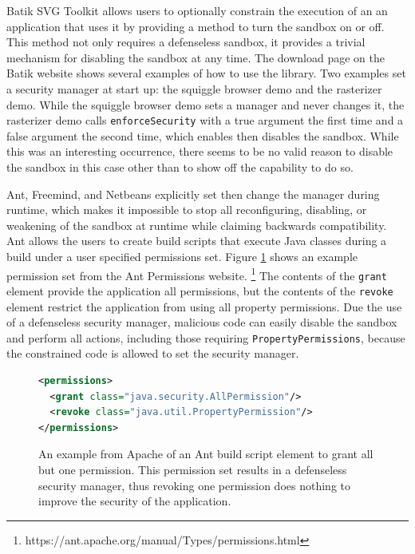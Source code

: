 \documentclass{sig-alternate}
\begin{document}
Batik SVG Toolkit allows users to optionally constrain the execution of an an application
that uses it by providing a method to turn the sandbox on or off. This method not only requires a defenseless sandbox, it provides a trivial mechanism for disabling the sandbox at any time. The download page on the Batik
website shows several examples of how to use the library. Two examples set
a security manager at start up: the squiggle browser demo and the
rasterizer demo. While the squiggle browser demo sets a manager and
never changes it, the rasterizer demo calls \texttt{enforceSecurity}
with a true argument the first time and a false argument the second
time, which enables then disables the sandbox. While this was an interesting
occurrence, there seems to be no valid reason to disable the sandbox
in this case other than to show off the capability to do so.

Ant, Freemind, and Netbeans explicitly set then change the manager
during runtime, which makes it impossible to stop all reconfiguring, disabling, or weakening of the sandbox at runtime while claiming backwards compatibility. Ant allows the users to create build scripts that
execute Java classes during a build under a user specified
permissions set. Figure \ref{fig:Ant Permissions Example}
shows an example permission set from the Ant Permissions website.%
\footnote{https://ant.apache.org/manual/Types/permissions.html%
} The contents of the \texttt{grant} element provide the application
all permissions, but the contents of the \texttt{revoke} element restrict
the application from using all property permissions. Due the use of a
defenseless security manager, malicious code can easily disable the sandbox and perform all actions,
including those requiring \texttt{PropertyPermissions}, because the constrained code is allowed to set the security manager.

\begin{figure}
\begin{lstlisting}[language=XML,basicstyle={\scriptsize}]
<permissions>   
  <grant class="java.security.AllPermission"/>   
  <revoke class="java.util.PropertyPermission"/> 
</permissions>
\end{lstlisting}

\caption{An example from Apache of an Ant build script element to grant all but one permission. This permission set results in a defenseless security manager, thus revoking one permission does nothing to improve the security of the application.}
\label{fig:Ant Permissions Example}
\end{figure}
\end{document}
